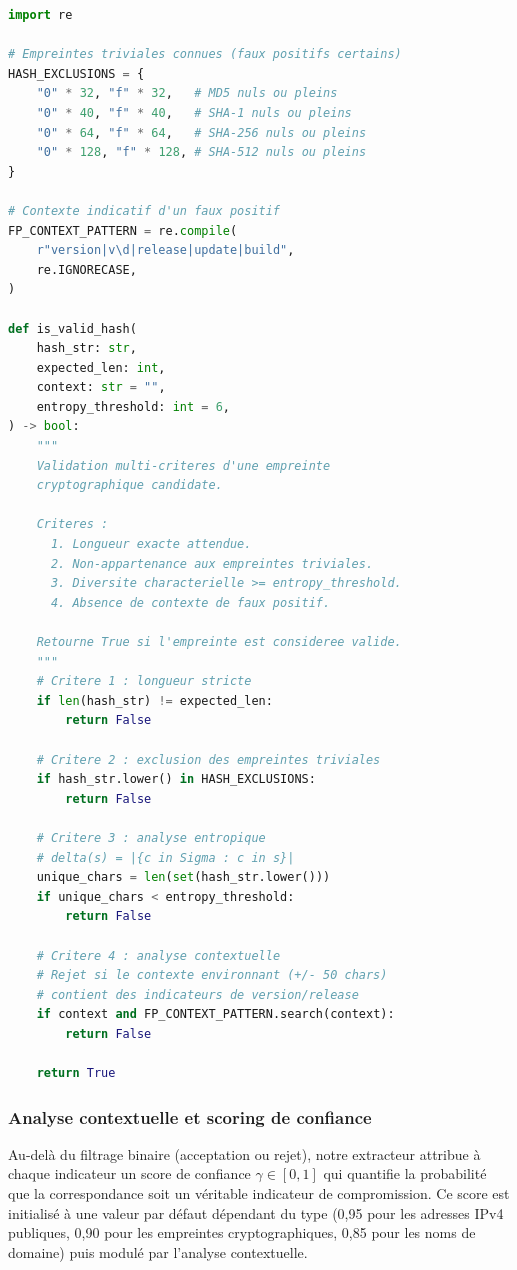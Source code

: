 \begin{lstlisting}[language=Python, caption={Validation d'empreinte cryptographique par analyse entropique et exclusion contextuelle.}, label={lst:entropy}]
import re

# Empreintes triviales connues (faux positifs certains)
HASH_EXCLUSIONS = {
    "0" * 32, "f" * 32,   # MD5 nuls ou pleins
    "0" * 40, "f" * 40,   # SHA-1 nuls ou pleins
    "0" * 64, "f" * 64,   # SHA-256 nuls ou pleins
    "0" * 128, "f" * 128, # SHA-512 nuls ou pleins
}

# Contexte indicatif d'un faux positif
FP_CONTEXT_PATTERN = re.compile(
    r"version|v\d|release|update|build",
    re.IGNORECASE,
)

def is_valid_hash(
    hash_str: str,
    expected_len: int,
    context: str = "",
    entropy_threshold: int = 6,
) -> bool:
    """
    Validation multi-criteres d'une empreinte
    cryptographique candidate.

    Criteres :
      1. Longueur exacte attendue.
      2. Non-appartenance aux empreintes triviales.
      3. Diversite characterielle >= entropy_threshold.
      4. Absence de contexte de faux positif.

    Retourne True si l'empreinte est consideree valide.
    """
    # Critere 1 : longueur stricte
    if len(hash_str) != expected_len:
        return False

    # Critere 2 : exclusion des empreintes triviales
    if hash_str.lower() in HASH_EXCLUSIONS:
        return False

    # Critere 3 : analyse entropique
    # delta(s) = |{c in Sigma : c in s}|
    unique_chars = len(set(hash_str.lower()))
    if unique_chars < entropy_threshold:
        return False

    # Critere 4 : analyse contextuelle
    # Rejet si le contexte environnant (+/- 50 chars)
    # contient des indicateurs de version/release
    if context and FP_CONTEXT_PATTERN.search(context):
        return False

    return True
\end{lstlisting}

\subsubsection{Analyse contextuelle et scoring de confiance}

Au-delà du filtrage binaire (acceptation ou rejet), notre extracteur attribue à chaque indicateur un score de confiance $\gamma \in [0, 1]$ qui quantifie la probabilité que la correspondance soit un véritable indicateur de compromission. Ce score est initialisé à une valeur par défaut dépendant du type (0{,}95 pour les adresses IPv4 publiques, 0{,}90 pour les empreintes cryptographiques, 0{,}85 pour les noms de domaine) puis modulé par l'analyse contextuelle.

